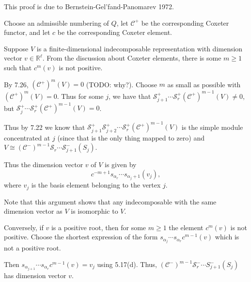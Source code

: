 This proof is due to Bernstein-Gel'fand-Panomarev 1972.

Choose an admissible numbering of $Q$, let $\mathcal{C}^+$ be the
corresponding Coxeter functor, and let $c$ be the corresponding Coxeter
element.

Suppose $V$ is a finite-dimensional indecomposable representation with dimension
vector $v \in \mathbb{R}^{\ell}$. From the discussion about Coxeter elements,
there is some $m\geq 1$ such that $c^m(v)$ is not positive.

By 7.26, $(\mathcal{C}^+)^m(V) = 0$ (TODO: why?). Choose $m$ as small as possible with
$(\mathcal{C}^+)^m(V) = 0$. Thus for some $j$, we have that
$\mathcal{S}^+_{j+1}\cdots \mathcal{S}_r^+(\mathcal{C}^+)^{m-1}(V)\neq 0$,
but
$\mathcal{S}^+_{j}\cdots \mathcal{S}_r^+(\mathcal{C}^+)^{m-1}(V) = 0$.

Thus by 7.22 we know that $\mathcal{S}_{j+1}^+\mathcal{S}_{j+2}^+\cdots \mathcal{S}_r^+(\mathcal{C}^+)^{m-1}(V)$
is the simple module concentrated at $j$ (since that is the only thing mapped to
zero) and $V\cong (\mathcal{C}^-)^{m-1}\mathcal{S}_r\cdots \mathcal{S}_{j+1}^-(S_j)$.

Thus the dimension vector $v$ of $V$ is given by
\[ c^{-m+1}s_{\alpha_r}\cdots s_{\alpha_j+1}(v_j), \]
where $v_j$ is the basis element belonging to the vertex $j$.

Note that this argument shows that any indecomposable with the same dimension
vector as $V$ is isomorphic to $V$.

Conversely, if $v$ is a positive root, then for some $m\geq 1$ the element
$c^m(v)$ is not positive. Choose the shortest expression of the form
$s_{\alpha_j}\cdots s_{\alpha_r}c^{m-1}(v)$ which is not a positive root.

Then $s_{\alpha_{j+1}}\cdots s_{\alpha_r}c^{m-1}(v) = v_j$ using 5.17(d). Thus,
$(\mathcal{C}^-)^{m-1}\mathcal{S}_r^-\cdots S_{j+1}^-(S_j)$ has dimension
vector $v$.
